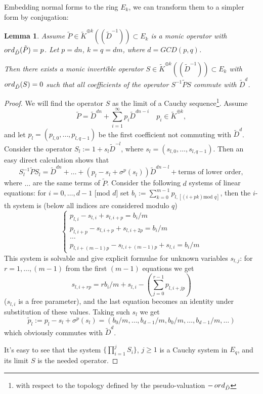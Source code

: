 \documentclass[11pt]{article}
\theoremstyle{definition}
\newcommand{\ord}{\mathop{\rm ord}\nolimits}
\theoremstyle{plain}
\newtheorem{lemma}{Lemma}[section]
\numberwithin{equation}{section}
\begin{document}
Embedding normal forms to the ring $E_k$, we can transform them to a simpler form by conjugation:
\begin{lemma}
\label{L:conjugation in E_q}
Assume $\tilde{P}\in \tilde{K}^{\oplus k}((\tilde{D}^{-1}))\subset E_k$ is a monic operator with $\ord_{\tilde{D}}(\tilde{P})=p$. Let $p=dn$, $k=q=dm$, where $d=GCD (p,q)$. 

Then there exists a monic invertible operator $S\in \tilde{K}^{\oplus k}((\tilde{D}^{-1}))\subset E_k$ with $\ord_{\tilde{D}}(S)=0$ such that all coefficients of the operator $S^{-1}\tilde{P}S$ commute with $\tilde{D}^d$.
\end{lemma}

\begin{proof}
We will find the operator $S$ as the limit of a Cauchy sequence\footnote{with respect to the topology defined by the pseudo-valuation $-\ord_{\tilde{D}}$}. Assume 
$$
\tilde{P}=\tilde{D}^{dn}+\sum_{i=1}^{\infty}p_i\tilde{D}^{dn-i} \quad p_i\in \tilde{K}^{\oplus k}, 
$$
and let $p_l=(p_{l,0}, \ldots ,p_{l,q-1})$ be the first coefficient not commuting with $\tilde{D}^d$. Consider the operator $S_l:=1+s_l \tilde{D}^{-l}$, where $s_l=(s_{l,0},\ldots , s_{l,q-1})$. Then an easy direct calculation shows that
$$
S_l^{-1}\tilde{P} S_l=\tilde{D}^{dn}+\ldots + (p_l-s_l+\sigma^{p}(s_l))\tilde{D}^{dn-l}+\mbox{terms of lower order},
$$
where $\ldots$ are the same terms of $\tilde{P}$. Consider the following $d$ systems of linear equations: for $i=0, \ldots , d-1$ [mod $d$] set $b_i:=\sum_{k=0}^{m-1}p_{l,[(i+pk) \mbox{mod $q$}] }$, then the $i$-th system is (below all indices are considered modulo $q$)
$$
\begin{cases}
p_{l,i}-s_{l,i}+s_{l,i+p}=b_i/m \\
p_{l,i+p}-s_{l,i+p}+s_{l,i+2p}=b_i/m \\
\ldots \\
p_{l,i+(m-1)p}-s_{l,i+(m-1)p}+s_{l,i}=b_i/m
\end{cases}
$$ 
This system is solvable and give explicit formulae for unknown variables $s_{l,j}$: for $r=1,\ldots ,(m-1)$ from the first $(m-1)$ equations we get 
$$s_{l,i+rp}=r b_i/m+s_{l,i}-(\sum_{j=0}^{r-1} p_{l,i+jp})$$
($s_{l,i}$ is a free parameter), and the last equation becomes an identity under substitution of these values. Taking such $s_l$ we get
$$
\tilde{p}_l:= p_l-s_l+\sigma^{p}(s_l)= (b_0/m, \ldots , b_{d-1}/m, b_0/m, \ldots , b_{d-1}/m, \ldots )
$$ 
which obviously commutes with $\tilde{D}^d$. 

It's easy to see that the system $\{\prod_{i=1}^j S_i\}$, $j\ge 1$ is a Cauchy system in $E_q$, and its limit $S$ is the needed operator. 
\end{proof}
\end{document}
